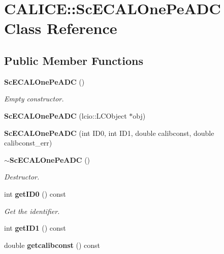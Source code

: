 \section{CALICE::ScECALOnePeADC Class Reference}
\label{classCALICE_1_1ScECALOnePeADC}
\subsection*{Public Member Functions}
\begin{DoxyCompactItemize}
\item 
{\bf ScECALOnePeADC} ()\label{classCALICE_1_1ScECALOnePeADC_ada5bb4f970cf3941319150b1654f0177}

\begin{DoxyCompactList}\small\item\em Empty constructor. \item\end{DoxyCompactList}\item 
{\bfseries ScECALOnePeADC} (lcio::LCObject $\ast$obj)\label{classCALICE_1_1ScECALOnePeADC_a6e329c1c96bbcfa394c39c8112ed37a0}

\item 
{\bfseries ScECALOnePeADC} (int ID0, int ID1, double calibconst, double calibconst\_\-err)\label{classCALICE_1_1ScECALOnePeADC_a94d545c07e0bbe9c8afa2fe7dcdd16ec}

\item 
{\bf $\sim$ScECALOnePeADC} ()\label{classCALICE_1_1ScECALOnePeADC_a98190ce37bb90d719a7c4018f17f219f}

\begin{DoxyCompactList}\small\item\em Destructor. \item\end{DoxyCompactList}\item 
int {\bf getID0} () const \label{classCALICE_1_1ScECALOnePeADC_acf761b76b965891033defa4d5c101a7c}

\begin{DoxyCompactList}\small\item\em Get the identifier. \item\end{DoxyCompactList}\item 
int {\bfseries getID1} () const \label{classCALICE_1_1ScECALOnePeADC_a4b5ea62b5831486c7f12446cc29ee43e}

\item 
double {\bf getcalibconst} () const \label{classCALICE_1_1ScECALOnePeADC_a65c6a5fcd63673f0ed1cfad68b2a06dc}


\end{DoxyCompactItemize}
